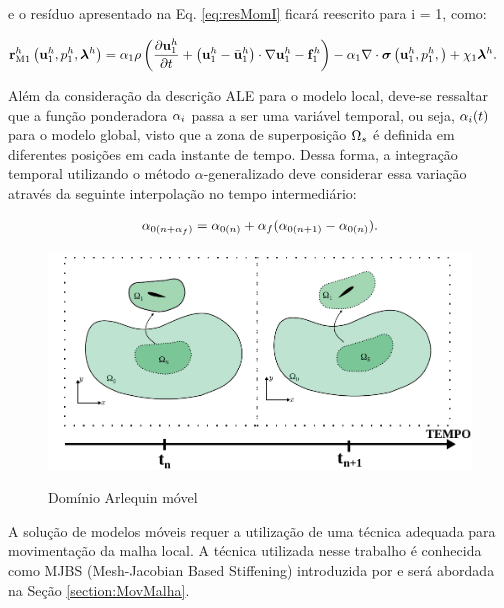 \documentclass[tese_patricia]{subfiles}
\begin{document}
\noindent e o resíduo apresentado na Eq. \ref{eq:resMomI} ficará reescrito para i = 1, como:


\begin{align}
	\mathbf{r}_{\mathrm{M1}}^{h} \left(\mathbf{u}_1^h,p_1^h,\boldsymbol{\lambda}^h \right)&=\alpha_{1} \rho\left(\frac{\partial\mathbf{u}_1^h}{\partial t}+ \left(\mathbf{u}_1^h - \bar{\mathbf{u}}^h_{1}\right) \cdot \nabla\mathbf{u}_1^h  - \mathbf{f}_1^{h}\right) - \alpha_{1} \nabla \cdot \boldsymbol{\sigma}\left(\mathbf{u}_1^h,p_1^h,\right)+ \chi_{1} \boldsymbol{\lambda}^h \label{eq:resMomARLQALE}.
\end{align}

Além da consideração da descrição ALE para o modelo local, deve-se ressaltar que a função ponderadora $\alpha_{i}$ passa a ser uma variável temporal, ou seja, $\alpha_{i}(t)$ para o modelo global, visto que a zona de superposição $\Omega_s$ é definida em diferentes posições em cada instante de tempo. Dessa forma, a integração temporal utilizando o método $\alpha$-generalizado deve considerar essa variação através da seguinte interpolação no tempo intermediário:

\begin{align}
	\alpha_{0(n+\alpha_f)} = \alpha_{0(n)} + \alpha_f(\alpha_{0(n+1)} - \alpha_{0(n)}).
\end{align}

\begin{figure}[htb!]
	\centering 
	{\includegraphics[scale=1.0,trim=0cm 0cm 0cm 0cm, clip=true]{Imagens/Cap6/dominioArlequinMoving.pdf}}	
	\caption{Domínio Arlequin móvel}
	\label{fig:ArlquinMóvel}
\end{figure}

A solução de modelos móveis requer a utilização de uma técnica adequada para movimentação da malha local. A técnica utilizada nesse trabalho é conhecida como MJBS (Mesh-Jacobian Based Stiffening) introduzida por  e será abordada na Seção \ref{section:MovMalha}.
\end{document}
